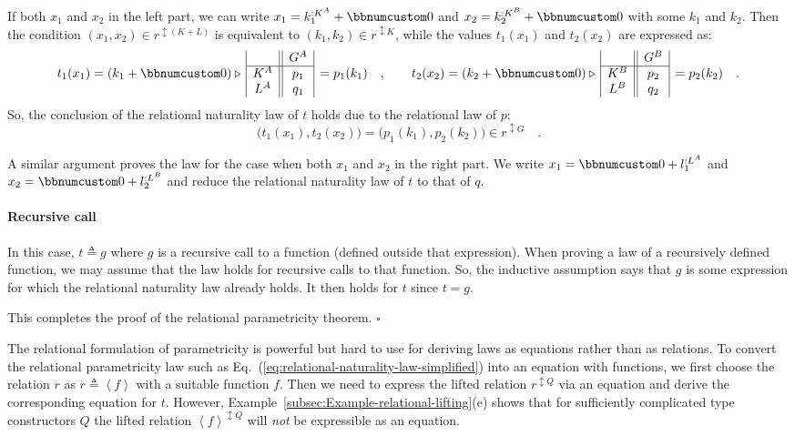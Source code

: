 If both $x_{1}$ and $x_{2}$ in the left part, we can write $x_{1}=k_{1}^{:K^{A}}+\bbnum 0$
and $x_{2}=k_{2}^{:K^{B}}+\bbnum 0$ with some $k_{1}$ and $k_{2}$.
Then the condition $(x_{1},x_{2})\in r^{\updownarrow(K+L)}$ is equivalent
to $(k_{1},k_{2})\in r^{\updownarrow K}$, while the values $t_{1}(x_{1})$
and $t_{2}(x_{2})$ are expressed as:
\[
t_{1}(x_{1})=(k_{1}+\bbnum 0)\triangleright\,\begin{array}{|c||c|}
 & G^{A}\\
\hline K^{A} & p_{1}\\
L^{A} & q_{1}
\end{array}\,=p_{1}(k_{1})\quad,\quad\quad t_{2}(x_{2})=(k_{2}+\bbnum 0)\triangleright\,\begin{array}{|c||c|}
 & G^{B}\\
\hline K^{B} & p_{2}\\
L^{B} & q_{2}
\end{array}\,=p_{2}(k_{2})\quad.
\]
So, the conclusion of the relational naturality law of $t$ holds
due to the relational law of $p$:
\[
\big(t_{1}(x_{1}),t_{2}(x_{2})\big)=\big(p_{1}(k_{1}),p_{2}(k_{2})\big)\in r^{\updownarrow G}\quad.
\]

A similar argument proves the law for the case when both $x_{1}$
and $x_{2}$ in the right part. We write $x_{1}=\bbnum 0+l_{1}^{:L^{A}}$
and $x_{2}=\bbnum 0+l_{2}^{:L^{B}}$ and reduce the relational naturality
law of $t$ to that of $q$.

\paragraph{Recursive call}

In this case, $t\triangleq g$ where $g$ is a recursive call to a
function (defined outside that expression). When proving a law of
a recursively defined function, we may assume that the law holds for
recursive calls to that function. So, the inductive assumption says
that $g$ is some expression for which the relational naturality law
already holds. It then holds for $t$ since $t=g$.

This completes the proof of the relational parametricity theorem.
$\square$ 

The relational formulation of parametricity is powerful but hard to
use for deriving laws as equations rather than as relations. To convert
the relational parametricity law such as Eq.~(\ref{eq:relational-naturality-law-simplified})
into an equation with functions, we first choose the relation $r$
as $r\triangleq\left<f\right>$ with a suitable function $f$. Then
we need to express the lifted relation $r^{\updownarrow Q}$ via an
equation and derive the corresponding equation for $t$. However,
Example~\ref{subsec:Example-relational-lifting}(e) shows that for
sufficiently complicated type constructors $Q$ the lifted relation
$\left<f\right>^{\updownarrow Q}$ will \emph{not} be expressible
as an equation. 

